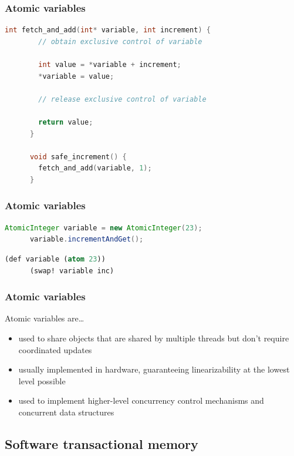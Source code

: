 \documentclass{beamer}
\begin{document}
  \begin{frame}[fragile]
    \frametitle{Atomic variables}

    \begin{lstlisting}[basicstyle=\scriptsize\ttfamily,language=C]
      int fetch_and_add(int* variable, int increment) {
        // obtain exclusive control of variable

        int value = *variable + increment;
        *variable = value;

        // release exclusive control of variable

        return value;
      }

      void safe_increment() {
        fetch_and_add(variable, 1);
      }
    \end{lstlisting}
\end{frame}

  \begin{frame}[fragile]
    \frametitle{Atomic variables}

    \begin{lstlisting}[basicstyle=\scriptsize\ttfamily,language=Java]
      AtomicInteger variable = new AtomicInteger(23);
      variable.incrementAndGet();
    \end{lstlisting}

    \vfill

    \begin{lstlisting}[basicstyle=\scriptsize\ttfamily,language=Lisp]
      (def variable (atom 23))
      (swap! variable inc)
    \end{lstlisting}
\end{frame}

  \begin{frame}
    \frametitle{Atomic variables}

    Atomic variables are\ldots

    \begin{itemize}
      \item used to share objects that are shared by multiple threads but don't require coordinated updates
      \item usually implemented in hardware, guaranteeing linearizability at the lowest level possible
      \item used to implement higher-level concurrency control mechanisms and concurrent data structures
    \end{itemize}
  \end{frame}

  \subsection{Software transactional memory}
\end{document}
